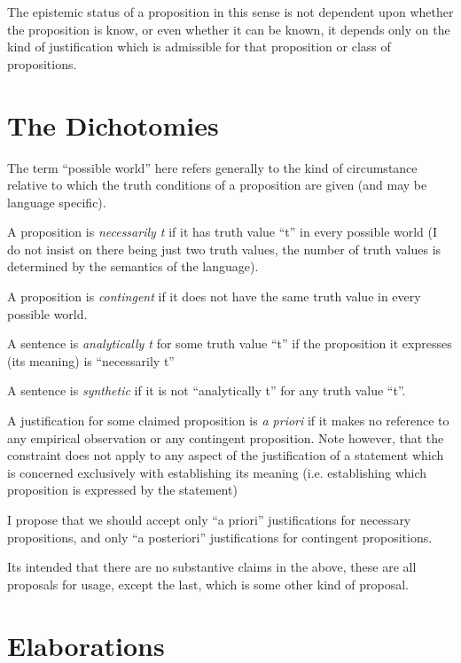 The epistemic status of a proposition in this sense is not dependent upon whether the proposition is know, or even whether it can be known, it depends only on the kind of justification which is admissible for that proposition or class of propositions.

\section{The Dichotomies}

The term ``possible world'' here refers generally to the kind of circumstance relative to which the truth conditions of a proposition are given (and may be language specific).

A proposition is {\it necessarily t} if it has truth value ``t'' in every possible world (I do not insist on there being just two truth values, the number of truth values is determined by the semantics of the language).

A proposition is {\it contingent} if it does not have the same truth value in every possible world.

A sentence is {\it analytically t} for some truth value ``t''	if the proposition it expresses (its meaning) is ``necessarily t''

A sentence is {\it synthetic} if it is not ``analytically t'' for any truth value ``t''.

A justification for some claimed proposition is {\it a priori} if it makes no reference to any empirical observation or any contingent proposition.
Note however, that the constraint does not apply to any aspect of the justification of a statement	which is concerned exclusively with establishing its meaning (i.e. establishing which proposition is expressed by the statement)

I propose that we should accept only ``a priori'' justifications for necessary propositions, and only ``a posteriori'' justifications for contingent propositions.

Its intended that there are no substantive claims in the above, these
are all proposals for usage, except the last, which is some other
kind of proposal.

\section{Elaborations}

